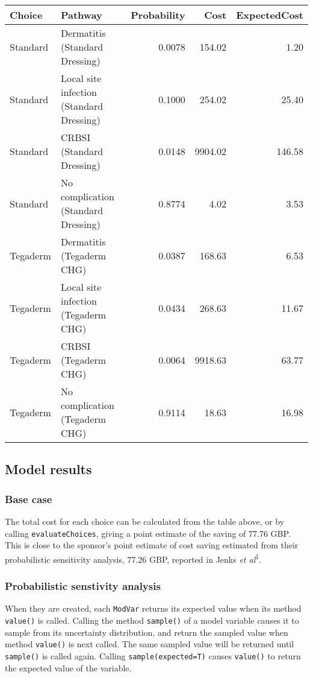 \documentclass[]{article}
\begin{document}
\begin{longtable}[]{@{}llrrr@{}}
\toprule
Choice & Pathway & Probability & Cost & ExpectedCost\tabularnewline
\midrule
\endhead
Standard & Dermatitis (Standard Dressing) & 0.0078 & 154.02 &
1.20\tabularnewline
Standard & Local site infection (Standard Dressing) & 0.1000 & 254.02 &
25.40\tabularnewline
Standard & CRBSI (Standard Dressing) & 0.0148 & 9904.02 &
146.58\tabularnewline
Standard & No complication (Standard Dressing) & 0.8774 & 4.02 &
3.53\tabularnewline
Tegaderm & Dermatitis (Tegaderm CHG) & 0.0387 & 168.63 &
6.53\tabularnewline
Tegaderm & Local site infection (Tegaderm CHG) & 0.0434 & 268.63 &
11.67\tabularnewline
Tegaderm & CRBSI (Tegaderm CHG) & 0.0064 & 9918.63 &
63.77\tabularnewline
Tegaderm & No complication (Tegaderm CHG) & 0.9114 & 18.63 &
16.98\tabularnewline
\bottomrule
\end{longtable}

\hypertarget{model-results}{%
\subsection{Model results}\label{model-results}}

\hypertarget{base-case}{%
\subsubsection{Base case}\label{base-case}}

The total cost for each choice can be calculated from the table above,
or by calling \texttt{evaluateChoices}, giving a point estimate of the
saving of 77.76 GBP. This is close to the sponsor's point estimate of
cost saving estimated from their probabilistic sensitivity analysis,
77.26 GBP, reported in Jenks \emph{et al}\textsuperscript{1}.

\hypertarget{probabilistic-senstivity-analysis}{%
\subsubsection{Probabilistic senstivity
analysis}\label{probabilistic-senstivity-analysis}}

When they are created, each \texttt{ModVar} returns its expected value
when its method \texttt{value()} is called. Calling the method
\texttt{sample()} of a model variable causes it to sample from its
uncertainty distribution, and return the sampled value when method
\texttt{value()} is next called. The same sampled value will be returned
until \texttt{sample()} is called again. Calling
\texttt{sample(expected=T)} causes \texttt{value()} to return the
expected value of the variable.
\end{document}
